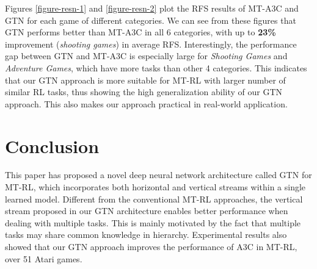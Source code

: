 \documentclass[letterpaper]{article} %
\begin{document}
Figures \ref{figure-resn-1} and \ref{figure-resn-2} plot the RFS results of MT-A3C and GTN for each game of different categories.
We can see from these figures that GTN performs better than MT-A3C in all 6 categories, with up to \textbf{23\%} improvement (\textit{shooting games}) in average RFS.
Interestingly, the performance gap between GTN and MT-A3C is especially large for \textit{Shooting Games} and \textit{Adventure Games}, which have more tasks than other 4 categories.
This indicates that our GTN approach is more suitable for MT-RL with larger number of similar RL tasks, thus showing the high generalization ability of our GTN approach.
This also makes our approach practical in real-world application.

\section{Conclusion}

This paper has proposed a novel deep neural network architecture called GTN for MT-RL, which incorporates both horizontal and vertical streams within a single learned model.
Different from the conventional MT-RL approaches, the vertical stream proposed in our GTN architecture enables better performance when dealing with multiple tasks.
This is mainly motivated by the fact that multiple tasks may share common knowledge in hierarchy.
Experimental results also showed that our GTN approach improves the performance of A3C in MT-RL, over 51 Atari games.



\end{document}
